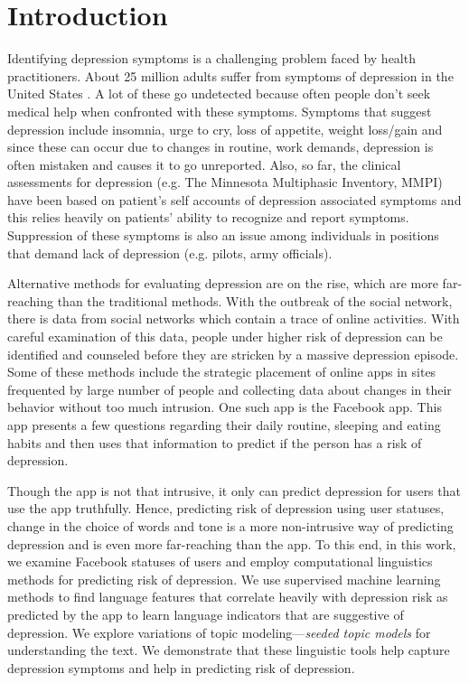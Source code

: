 \section{Introduction}
\label{sec:introduction}

Identifying depression symptoms is a challenging problem faced by health practitioners. About 25 million adults suffer from symptoms of depression in the United States \cite{NAMI2013}. A lot of these go undetected because often people don't seek medical help when confronted with these symptoms. Symptoms that suggest depression include insomnia, urge to cry, loss of appetite, weight loss/gain and since these can occur due to changes in routine, work demands, depression is often mistaken and causes it to go unreported. Also, so far, the clinical assessments for depression (e.g. The Minnesota Multiphasic Inventory, MMPI) have been based on patient's self accounts of depression associated symptoms and this relies heavily on patients' ability to recognize and report symptoms. Suppression of these symptoms is also an issue among individuals in positions that demand lack of depression (e.g. pilots, army officials). 

Alternative methods for evaluating depression are on the rise, which are more far-reaching than the traditional methods. With the outbreak of the social network, there is data from social networks which contain a trace of online activities. With careful examination of this data, people under higher risk of depression can be identified and counseled before they are stricken by a massive depression episode. Some of these methods include the strategic placement of online apps in sites frequented by large number of people and collecting data about changes in their behavior without too much intrusion. One such app is the Facebook app. This app presents a few questions regarding their daily routine, sleeping and eating habits and then uses that information to predict if the person has a risk of depression. 


Though the app is not that intrusive, it only can predict depression for users that use the app truthfully. Hence, predicting risk of depression using user statuses, change in the choice of words and tone is a more non-intrusive way of predicting depression and is even more far-reaching than the app. To this end, in this work, we examine Facebook statuses of users and employ computational linguistics methods for predicting risk of depression. We use supervised machine learning methods to find language features that correlate heavily with depression risk as predicted by the app to learn language indicators that are suggestive of depression.
We explore variations of topic modeling---\textit{seeded topic models} \cite{jagarlamudi12} for understanding the text. We demonstrate that these linguistic tools help capture depression symptoms and help in predicting risk of depression.

